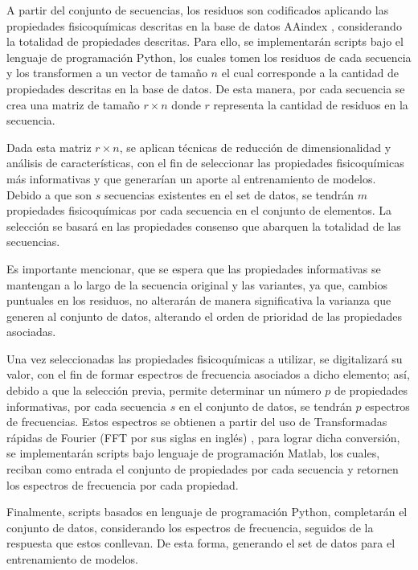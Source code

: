 A partir del conjunto de secuencias, los residuos son codificados aplicando las propiedades fisicoquímicas descritas en la base de datos AAindex \cite{Kawashima2000}, considerando la totalidad de propiedades descritas. Para ello, se implementarán scripts bajo el lenguaje de programación Python, los cuales tomen los residuos de cada secuencia y los transformen a un vector de tamaño $n$ el cual corresponde a la cantidad de propiedades descritas en la base de datos. De esta manera, por cada secuencia se crea una matriz de tamaño $r \times n$ donde $r$ representa la cantidad de residuos en la secuencia.

Dada esta matriz $r \times n$, se aplican técnicas de reducción de dimensionalidad y análisis de características, con el fin de seleccionar las propiedades fisicoquímicas más informativas y que generarían un aporte al entrenamiento de modelos. Debido a que son $s$ secuencias existentes en el set de datos, se tendrán $m$ propiedades fisicoquímicas por cada secuencia en el conjunto de elementos. La selección se basará en las propiedades consenso que abarquen la totalidad de las secuencias. 

Es importante mencionar, que se espera que las propiedades informativas se mantengan a lo largo de la secuencia original y las variantes, ya que, cambios puntuales en los residuos, no alterarán de manera significativa la varianza que generen al conjunto de datos, alterando el orden de prioridad de las propiedades asociadas.

Una vez seleccionadas las propiedades fisicoquímicas a utilizar, se digitalizará su valor, con el fin de formar espectros de frecuencia asociados a dicho elemento; así, debido a que la selección previa, permite determinar un número $p$ de propiedades informativas, por cada secuencia $s$ en el conjunto de datos, se tendrán $p$ espectros de frecuencias. Estos espectros se obtienen a partir del uso de Transformadas rápidas de Fourier (FFT por sus siglas en inglés) \cite{brigham1988fast}, para lograr dicha conversión, se implementarán scripts bajo lenguaje de programación Matlab, los cuales, reciban como entrada el conjunto de propiedades por cada secuencia y retornen los espectros de frecuencia por cada propiedad. 

Finalmente, scripts basados en lenguaje de programación Python, completarán el conjunto de datos, considerando los espectros de frecuencia, seguidos de la respuesta que estos conllevan. De esta forma, generando el set de datos para el entrenamiento de modelos.

